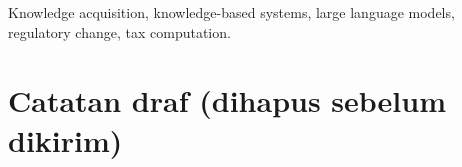 \documentclass{ieeeaccess}
\begin{document}
\begin{keywords}
Knowledge acquisition, knowledge-based systems, large language models, regulatory change, tax computation.
\end{keywords}

\titlepgskip=-21pt

\maketitle

\section*{Catatan draf (dihapus sebelum dikirim)}
\end{document}
